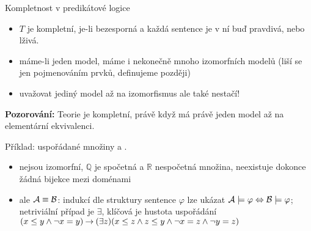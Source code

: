 \documentclass{beamer}
\begin{document}
\begin{frame}{Kompletnost v predikátové logice}


    
    \begin{itemize}
        \item $T$ je \alert{kompletní}, je-li bezesporná a každá \alert{sentence} je v ní buď pravdivá, nebo lživá. 
        \item máme-li jeden model, máme i nekonečně mnoho \alert{izomorfních} modelů (liší se jen pojmenováním prvků, definujeme později)
        \item uvažovat jediný model \alert{až na izomorfismus} ale také \alert{nestačí}!
    \end{itemize}
    
 
    \textbf{Pozorování:} Teorie je kompletní, právě když má právě jeden model \alert{až na elementární ekvivalenci}.   

    Příklad: uspořádané množiny  a .
     \begin{itemize}
        \item \alert{nejsou izomorfní}, $\mathbb Q$ je spočetná a $\mathbb R$ nespočetná množina, neexistuje dokonce žádná \alert{bijekce} mezi doménami
        \item \alert{ale $\mathcal{A}\equiv\mathcal{B}$}: indukcí dle struktury sentence $\varphi$ lze ukázat $\mathcal{A}\models\varphi\Leftrightarrow\mathcal{B}\models\varphi$; netriviální případ je $\exists$, klíčová je \alert{hustota} uspořádání $(x\leq y\land \neg x=y)\mathbin{\rightarrow}(\exists z)(x\leq z\land z\leq y\land \neg x=z\land\neg y=z)$
     \end{itemize}     

\end{frame}
\end{document}
